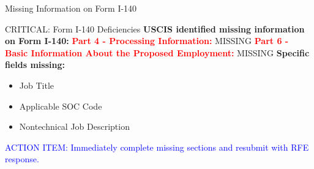 \documentclass[11pt]{beamer}
\begin{document}
	\begin{frame}{Missing Information on Form I-140}
		\scriptsize
		\begin{block}{CRITICAL: Form I-140 Deficiencies}
			\textbf{USCIS identified missing information on Form I-140:}
			\vspace{0.2cm}
			\textcolor{red}{\textbf{Part 4 - Processing Information:}} MISSING
			\vspace{0.2cm}
			\textcolor{red}{\textbf{Part 6 - Basic Information About the Proposed Employment:}} MISSING
			\vspace{0.2cm}
			\textbf{Specific fields missing:}
			\begin{itemize}
				\item Job Title
				\item Applicable SOC Code
				\item Nontechnical Job Description
			\end{itemize}
			\textcolor{blue}{ACTION ITEM: Immediately complete missing sections and resubmit with RFE response.}
		\end{block}
	\end{frame}
	
	
	
	
\end{document}
